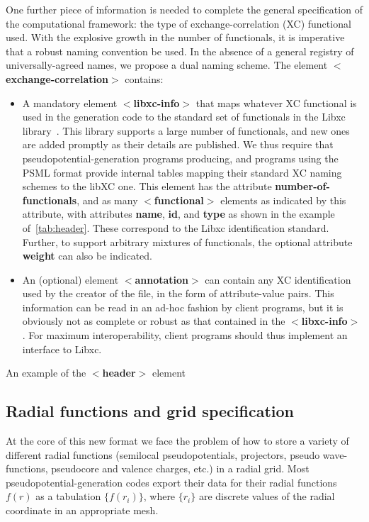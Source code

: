 \documentclass[prb,showpacs,superscriptaddress]{revtex4-1}
\def\tag#1{\textbf{$<$#1$>$}}
\def\att#1{\textbf{#1}}
\begin{document}
One further piece of information is needed to complete the
general specification of the computational framework: the type of
exchange-correlation (XC) functional used. With the explosive growth
in the number of functionals, it is imperative that a robust naming
convention be used. In the absence of a general registry of
universally-agreed names, we propose a dual naming scheme. 
The element \tag{exchange-correlation} contains:
\begin{itemize}
\item A mandatory element \tag{libxc-info} that maps whatever XC
  functional is used in the generation code to the standard set of
  functionals in the Libxc library~\cite{libxc}. This library supports
  a large number of functionals, and new ones are added promptly as
  their details are published. We thus require that
  pseudopotential-generation programs producing, and programs using
  the PSML format provide internal tables mapping their standard XC
  naming schemes to the libXC one. This element has the attribute
  \att{number-of-functionals}, and as many \tag{functional} elements
  as indicated by this attribute, with attributes \att{name},
  \att{id}, and \att{type} as shown in the example
  of~\ref{tab:header}. These correspond to the Libxc identification
  standard. Further, to support arbitrary mixtures of functionals, the
  optional attribute \att{weight} can also be indicated. 
\item An (optional) element \tag{annotation} can contain any XC
  identification used by the creator of the file, in the form of
  attribute-value pairs. This information can be read in an ad-hoc
  fashion by client programs, but it is obviously not as complete or
  robust as that contained in the \tag{libxc-info}. For maximum
  interoperability, client programs should thus implement an interface
  to Libxc.
\end{itemize}
%
 \begin{table}[h]
    \caption{ An example of the \tag{header} element }
    
    \label{table:header}
 \end{table}
%
\subsection{Radial functions and grid specification}

At the core of this new format we face the problem of how to store a
variety of different radial functions (semilocal pseudopotentials,
projectors, pseudo wave-functions, pseudocore and valence
charges, etc.) in a radial grid. Most pseudopotential-generation codes
export their data for their radial functions $f(r)$ as a tabulation
$\{f(r_i)\}$, where $\{r_i\}$ are discrete values of the radial
coordinate in an appropriate mesh.
\end{document}
